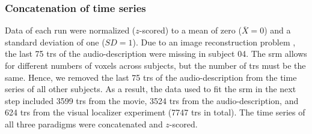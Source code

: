 \begin{comment}

The number of remaining voxels per subject can be seen in Table
\ref{tab:ppamaskvoxels} (range 1369--1951, $\overline{X}=1592$, $SD=188$).


\begin{table*}[btp] \caption{
%
\textbf{Table heading.}
%
The number of remaining voxels after masking time series data of each paradigm
and subject with the union of individual \acp{ppa} warped from MNI space
into each individual's subjects-space and the subject-specific field of view
of audio-description.
    }

\label{tab:ppamaskvoxels}
\begin{tabular}{ll}
\toprule
\textbf{Subject} & \textbf{no. of voxels} \\
\midrule
sub-01 & 1665 \tabularnewline
sub-02 & 1732 \tabularnewline
sub-03 & 1400 \tabularnewline
sub-04 & 1575 \tabularnewline
sub-05 & 1664 \tabularnewline
sub-06 & 1951 \tabularnewline
sub-14 & 1376 \tabularnewline
sub-09 & 1383 \tabularnewline
sub-15 & 1683 \tabularnewline
sub-16 & 1887 \tabularnewline
sub-17 & 1441 \tabularnewline
sub-18 & 1729 \tabularnewline
sub-19 & 1369 \tabularnewline
sub-20 & 1437 \tabularnewline
\bottomrule
\end{tabular}
\caption*{The legend text goes here.}
\end{table*}

\end{comment}



\subsubsection{Concatenation of time series}



Data of each run were normalized ($z$-scored) to a mean of zero
($\overline{X}=0$) and a standard deviation of one ($SD=1$).
%
Due to an image reconstruction problem \citep[s.][]{hanke2014audiomovie}, the
last 75 \acp{tr} of the audio-description were missing in subject 04.
%
The \ac{srm} allows for different numbers of voxels across subjects, but the
number of \acp{tr} must be the same.
%
Hence, we removed the last 75 \acp{tr} of the audio-description from the time
series of all other subjects.
As a result, the data used to fit the \ac{srm} in the next step included
3599 \acp{tr} from the movie, 3524 \acp{tr} from the audio-description, and 624
\acp{tr} from the visual localizer experiment (7747 \acp{tr} in total).
The time series of all three paradigms were concatenated and $z$-scored.



